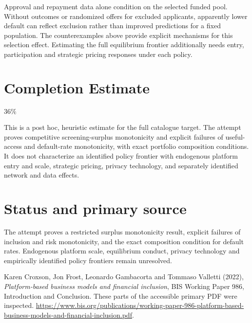 \documentclass[11pt]{article}
\begin{document}
Approval and repayment data alone condition on the selected funded pool. Without outcomes or randomized offers for excluded applicants, apparently lower default can reflect exclusion rather than improved predictions for a fixed population. The counterexamples above provide explicit mechanisms for this selection effect. Estimating the full equilibrium frontier additionally needs entry, participation and strategic pricing responses under each policy.

\section{Completion Estimate}
36\%

This is a post hoc, heuristic estimate for the full catalogue target.
The attempt proves competitive screening-surplus monotonicity and explicit failures of useful-access and default-rate monotonicity, with exact portfolio composition conditions. It does not characterize an identified policy frontier with endogenous platform entry and scale, strategic pricing, privacy technology, and separately identified network and data effects.

\section*{Status and primary source}
The attempt proves a restricted surplus monotonicity result, explicit failures of inclusion and risk monotonicity, and the exact composition condition for default rates. Endogenous platform scale, equilibrium conduct, privacy technology and empirically identified policy frontiers remain unresolved.

Karen Croxson, Jon Frost, Leonardo Gambacorta and Tommaso Valletti (2022), \emph{Platform-based business models and financial inclusion}, BIS Working Paper 986, Introduction and Conclusion. These parts of the accessible primary PDF were inspected. \url{https://www.bis.org/publications/working-paper-986-platform-based-business-models-and-financial-inclusion.pdf}.
\end{document}
